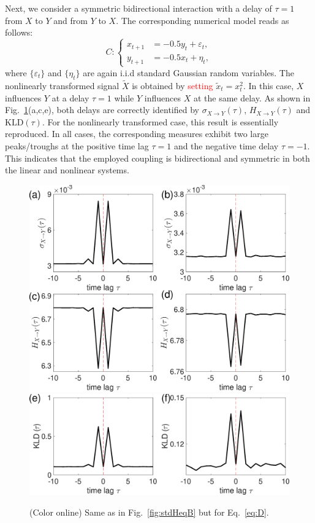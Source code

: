 \documentclass[12pt,aip,cha,reprint,nofootinbib]{revtex4-1}
\begin{document}
Next, we consider a symmetric bidirectional interaction with a delay of $\tau = 1$ from $X$ to $Y$ and from $Y$ to $X$. The corresponding numerical model reads as follows: 
\begin{equation} \label{eq:D}
C: \left \{ \begin{aligned}
x_{t+1} &= - 0.5 y_{t} + \varepsilon_t, \\
y_{t+1} &= - 0.5 x_{t} + \eta_t, 
\end{aligned}
\right.
\end{equation}
where $\{ \varepsilon_t \}$ and $\{ \eta_t \}$ are again i.i.d standard Gaussian random variables. The nonlinearly transformed signal $\tilde{X}$ is obtained by \textcolor{red}{setting} $\tilde{x}_{t} = x_{t}^{2}$. In this case, $X$ influences $Y$ at a delay $\tau = 1$ while $Y$ influences $X$ at the same delay. As shown in Fig.~\ref{fig:stdHeqD}(a,c,e), both delays are correctly identified by $\sigma_{X \to Y}(\tau)$, $H_{X \to Y}(\tau)$ and $\text{KLD}(\tau)$. For the nonlinearly transformed case, this result is essentially reproduced. In all cases, the corresponding measures exhibit two large peaks/troughs at the positive time lag $\tau = 1$ and the negative time delay $\tau = -1 $. This indicates that the employed coupling is bidirectional and symmetric in both the linear and nonlinear systems. 

\begin{figure}
	\centering
	\includegraphics[width=\columnwidth]{E_D.eps}
	\includegraphics[width=\columnwidth]{KL_D.eps}
\caption{(Color online) Same as in Fig.~\ref{fig:stdHeqB} but for Eq.~\eqref{eq:D}.   \label{fig:stdHeqD}}
\end{figure}
\end{document}
